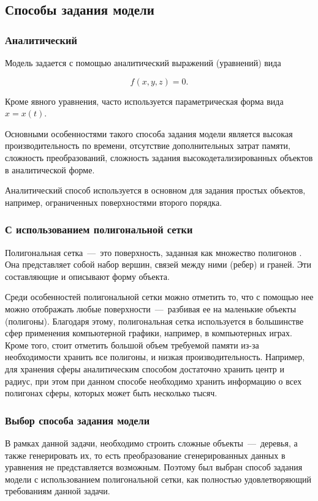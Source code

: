\subsection{Способы задания модели}
\subsubsection{Аналитический}
Модель задается с помощью аналитический выражений (уравнений) \cite{bib:4} вида

\begin{equation}
	f(x, y, z) = 0.
\end{equation}

Кроме явного уравнения, часто используется параметрическая форма вида $x = x(t)$.

Основными особенностями такого способа задания модели является высокая производительность по времени, отсутствие дополнительных затрат памяти, сложность преобразований, сложность задания высокодетализированных объектов в аналитической форме.

Аналитический способ используется в основном для задания простых объектов, например, ограниченных поверхностями второго порядка.

\subsubsection{С использованием полигональной сетки}
Полигональная сетка~---~это поверхность, заданная как множество полигонов \cite{bib:5}. Она представляет собой набор вершин, связей между ними (ребер) и граней. Эти составляющие и описывают форму объекта.

Среди особенностей полигональной сетки можно отметить то, что с помощью нее можно отображать любые поверхности~---~разбивая ее на маленькие объекты (полигоны). Благодаря этому, полигональная сетка используется в большинстве сфер применения компьютерной графики, например, в компьютерных играх. Кроме того, стоит отметить большой объем требуемой памяти из-за необходимости хранить все полигоны, и низкая производительность. Например, для хранения сферы аналитическим способом достаточно хранить центр и радиус, при этом при данном способе необходимо хранить информацию о всех полигонах сферы, которых может быть несколько тысяч.

\subsubsection{Выбор способа задания модели}
В рамках данной задачи, необходимо строить сложные объекты~---~деревья, а также генерировать их, то есть преобразование сгенерированных данных в уравнения не представляется возможным. Поэтому был выбран способ задания модели с использованием полигональной сетки, как полностью удовлетворяющий требованиям данной задачи.

